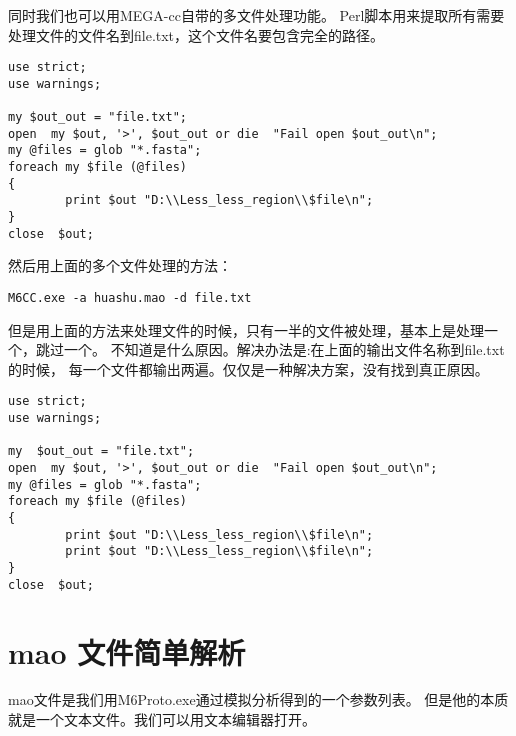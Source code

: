 \documentclass{ctexart}
\begin{document}
同时我们也可以用MEGA-cc自带的多文件处理功能。
Perl脚本用来提取所有需要处理文件的文件名到file.txt，这个文件名要包含完全的路径。

\begin{lstlisting}
use strict;
use warnings;

my $out_out = "file.txt";
open  my $out, '>', $out_out or die  "Fail open $out_out\n";
my @files = glob "*.fasta";
foreach my $file (@files)
{
        print $out "D:\\Less_less_region\\$file\n";
}
close  $out;
\end{lstlisting}
然后用上面的多个文件处理的方法：

\begin{lstlisting}
M6CC.exe -a huashu.mao -d file.txt
\end{lstlisting}
但是用上面的方法来处理文件的时候，只有一半的文件被处理，基本上是处理一个，跳过一个。
不知道是什么原因。解决办法是:在上面的输出文件名称到file.txt的时候，
每一个文件都输出两遍。仅仅是一种解决方案，没有找到真正原因。

\begin{lstlisting}
use strict;
use warnings;

my  $out_out = "file.txt";
open  my $out, '>', $out_out or die  "Fail open $out_out\n";
my @files = glob "*.fasta";
foreach my $file (@files)
{
        print $out "D:\\Less_less_region\\$file\n";
        print $out "D:\\Less_less_region\\$file\n";
}
close  $out;
\end{lstlisting}
\section{mao 文件简单解析}
\label{sec-4}

mao文件是我们用M6Proto.exe通过模拟分析得到的一个参数列表。
但是他的本质就是一个文本文件。我们可以用文本编辑器打开。
\end{document}
